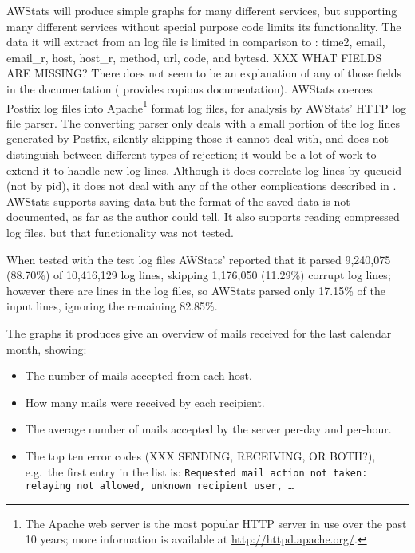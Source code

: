 AWStats will produce simple graphs for many different services, but
supporting many different services without special purpose code limits its
functionality.  The data it will extract from an \MTA{} log file is limited
in comparison to \parsername{}: \newline{} \tab{} time2, email, email\_r,
host, host\_r, method, url, code, and bytesd.\newline{} XXX WHAT FIELDS ARE
MISSING\@?  There does not seem to be an explanation of any of those fields
in the documentation (\parsername{} provides copious documentation).
AWStats coerces Postfix log files into Apache\footnote{The Apache web
server is the most popular HTTP server in use over the past 10 years; more
information is available at \url{http://httpd.apache.org/}.} format log
files, for analysis by AWStats' HTTP log file parser.  The converting
parser only deals with a small portion of the log lines generated by
Postfix, silently skipping those it cannot deal with, and does not
distinguish between different types of rejection; it would be a lot of work
to extend it to handle new log lines.  Although it does correlate log lines
by queueid (not by pid), it does not deal with any of the other
complications described in .  AWStats supports
saving data but the format of the saved data is not documented, as far as
the author could tell.  It also supports reading compressed log files, but
that functionality was not tested.

When tested with the \numberOFlogFILES{} test log files AWStats' reported
that it parsed 9,240,075 (88.70\%) of 10,416,129 log lines, skipping
1,176,050 (11.29\%) corrupt log lines; however there are
\numberOFlogLINES{} lines in the \numberOFlogFILES{} log files, so AWStats
parsed only 17.15\% of the input lines, ignoring the remaining 82.85\%.

The graphs it produces give an overview of mails received for the last
calendar month, showing:

\begin{itemize}

    \item The number of mails accepted from each host.

    \item How many mails were received by each recipient.

    \item The average number of mails accepted by the server per-day and
        per-hour.

    \item The top ten \SMTP{} error codes (XXX SENDING, RECEIVING, OR
        BOTH\@?), e.g.\ the first entry in the list is: \texttt{Requested
        mail action not taken: relaying not allowed, unknown recipient
        user, \ldots}

\end{itemize}


